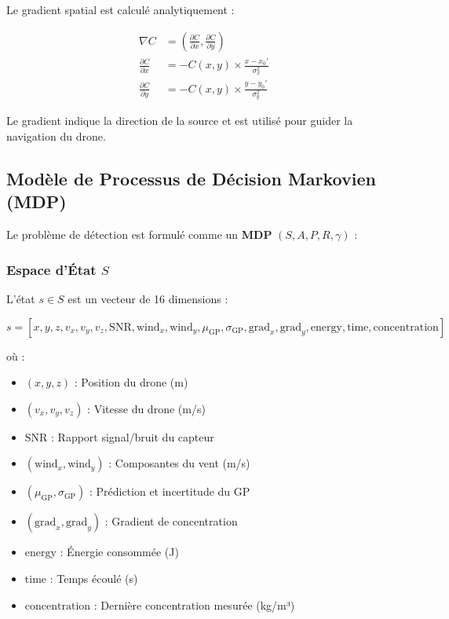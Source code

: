 \documentclass[12pt,a4paper]{article}
\newcommand{\gp}{\textsc{GP}}
\begin{document}
Le gradient spatial est calculé analytiquement :

\begin{align}
\nabla C &= \left(\frac{\partial C}{\partial x}, \frac{\partial C}{\partial y}\right) \\
\frac{\partial C}{\partial x} &= -C(x,y) \times \frac{x - x_0'}{\sigma_x^2} \\
\frac{\partial C}{\partial y} &= -C(x,y) \times \frac{y - y_0'}{\sigma_y^2}
\end{align}

Le gradient indique la direction de la source et est utilisé pour guider la navigation du drone.

\subsection{Modèle de Processus de Décision Markovien (MDP)}

Le problème de détection est formulé comme un \textbf{MDP} $(S, A, P, R, \gamma)$ :

\subsubsection{Espace d'État $S$}

L'état $s \in S$ est un vecteur de 16 dimensions :

\begin{equation}
s = [x, y, z, v_x, v_y, v_z, \text{SNR}, \text{wind}_x, \text{wind}_y, \mu_{\text{GP}}, \sigma_{\text{GP}}, \text{grad}_x, \text{grad}_y, \text{energy}, \text{time}, \text{concentration}]
\end{equation}

où :
\begin{itemize}
    \item $(x, y, z)$ : Position du drone (m)
    \item $(v_x, v_y, v_z)$ : Vitesse du drone (m/s)
    \item $\text{SNR}$ : Rapport signal/bruit du capteur
    \item $(\text{wind}_x, \text{wind}_y)$ : Composantes du vent (m/s)
    \item $(\mu_{\text{GP}}, \sigma_{\text{GP}})$ : Prédiction et incertitude du \gp{}
    \item $(\text{grad}_x, \text{grad}_y)$ : Gradient de concentration
    \item $\text{energy}$ : Énergie consommée (J)
    \item $\text{time}$ : Temps écoulé (s)
    \item $\text{concentration}$ : Dernière concentration mesurée (kg/m³)
\end{itemize}
\end{document}
